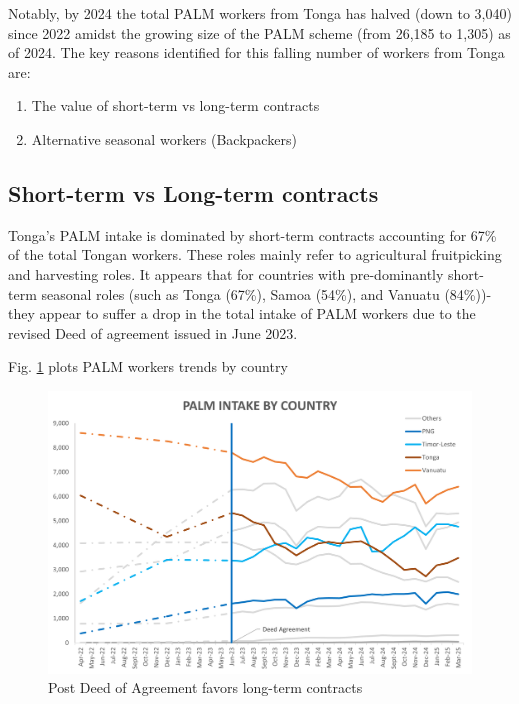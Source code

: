 \documentclass[9pt,a4paper,twocolumn,twoside]{tau-class/tau}
\begin{document}
     Notably, by 2024 the total PALM workers from Tonga has halved (down to 3,040) since 2022 amidst the growing size of the PALM scheme (from 26,185 to 1,305) as of 2024. The key reasons identified for this falling number of workers from Tonga are:

     \begin{enumerate}
  
 
  \item The value of short-term vs long-term contracts
   \item Alternative seasonal workers (Backpackers)
\end{enumerate}


    \subsection{Short-term vs Long-term contracts} Tonga's PALM intake is dominated by short-term contracts accounting for 67\% of the total Tongan workers. These roles mainly refer to agricultural fruitpicking and harvesting roles.
    It appears that for countries with pre-dominantly short-term seasonal roles (such as Tonga (67\%), Samoa (54\%), and Vanuatu (84\%))- they appear to suffer a drop in the total intake of PALM workers due to the revised Deed of agreement issued in June 2023. 
     
  
    
    
    

    	Fig. \ref{fig:PALMCOUNTRY} plots PALM workers trends by country
    		
    		
    	\begin{figure}[H]
    		\centering
    		\includegraphics[width=0.9\columnwidth]{figures/CountryPALMFINAL.png}
    		\caption{Post Deed of Agreement favors long-term contracts}
    		\label{fig:PALMCOUNTRY}
    	\end{figure}
\end{document}
